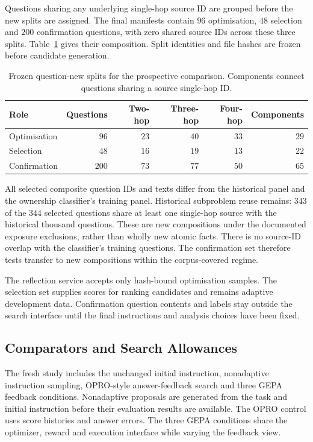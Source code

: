 Questions sharing any underlying single-hop source ID are grouped before
the new splits are assigned. The final manifests contain $96$ optimisation,
$48$ selection and $200$ confirmation questions, with zero shared source
IDs across these three splits. Table~\ref{tab:ch5-splits} gives their
composition. Split identities and file hashes are frozen before candidate
generation.

\begin{table}[H]
\centering
\small
\caption{Frozen question-new splits for the prospective comparison.
Components connect questions sharing a source single-hop ID.}
\label{tab:ch5-splits}
\begin{tabular}{lrrrrr}
\hline
Role & Questions & Two-hop & Three-hop & Four-hop & Components \\
\hline
Optimisation & $96$ & $23$ & $40$ & $33$ & $29$ \\
Selection & $48$ & $16$ & $19$ & $13$ & $22$ \\
Confirmation & $200$ & $73$ & $77$ & $50$ & $65$ \\
\hline
\end{tabular}
\end{table}

All selected composite question IDs and texts differ from the historical
panel and the ownership classifier's training panel. Historical subproblem
reuse remains: $343$ of the $344$ selected questions share at least one
single-hop source with the historical thousand questions. These are new
compositions under the documented exposure exclusions, rather than wholly
new atomic facts. There is no source-ID overlap with the classifier's
training questions. The confirmation set therefore tests transfer to new
compositions within the corpus-covered regime.

The reflection service accepts only hash-bound optimisation samples. The
selection set supplies scores for ranking candidates and remains adaptive
development data. Confirmation question contents and labels stay outside
the search interface until the final instructions and analysis choices have
been fixed.

\subsection{Comparators and Search Allowances}

The fresh study includes the unchanged initial instruction, nonadaptive
instruction sampling, OPRO-style answer-feedback search and three GEPA
feedback conditions. Nonadaptive proposals are generated from the task and
initial instruction before their evaluation results are available. The
OPRO control uses score histories and answer errors. The three GEPA
conditions share the optimizer, reward and execution interface while varying
the feedback view.

